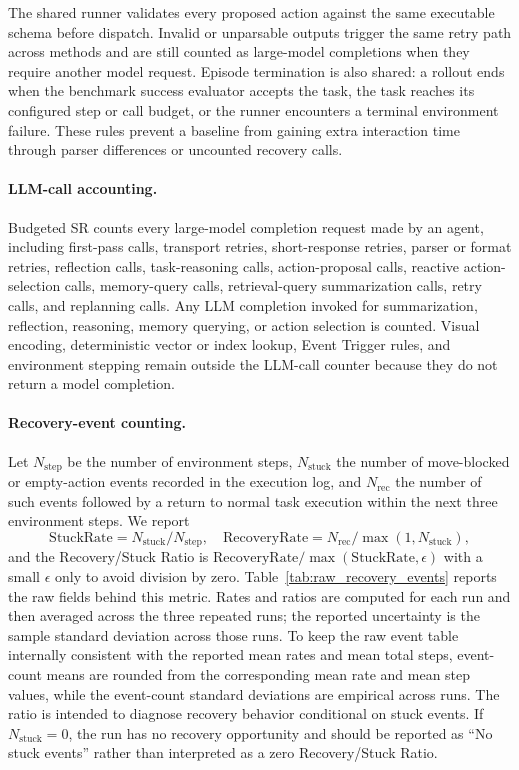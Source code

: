 The shared runner validates every proposed action against the same executable
schema before dispatch. Invalid or unparsable outputs trigger the same retry
path across methods and are still counted as large-model completions when they
require another model request. Episode termination is also shared: a rollout ends
when the benchmark success evaluator accepts the task, the task reaches its
configured step or call budget, or the runner encounters a terminal environment
failure. These rules prevent a baseline from gaining extra interaction time
through parser differences or uncounted recovery calls.

\paragraph{LLM-call accounting.}
\label{sec:appendix_llm_call_accounting}
Budgeted SR counts every large-model completion request made by an agent,
including first-pass calls, transport retries, short-response retries, parser
or format retries, reflection calls, task-reasoning calls, action-proposal
calls, reactive action-selection calls, memory-query calls, retrieval-query
summarization calls, retry calls, and replanning calls. Any LLM completion
invoked for summarization, reflection, reasoning, memory querying, or action
selection is counted. Visual encoding, deterministic vector or index lookup,
Event Trigger rules, and environment stepping remain outside the
LLM-call counter because they do not return a model completion.

\paragraph{Recovery-event counting.}
\label{sec:appendix_recovery_event_counting}
Let $N_{\mathrm{step}}$ be the number of environment steps,
$N_{\mathrm{stuck}}$ the number of move-blocked or empty-action events recorded
in the execution log, and $N_{\mathrm{rec}}$ the number of such events followed
by a return to normal task execution within the next three environment steps. We
report
\begin{equation}
\label{eq:recovery_metrics}
\mathrm{StuckRate}=N_{\mathrm{stuck}}/N_{\mathrm{step}},\quad
\mathrm{RecoveryRate}=N_{\mathrm{rec}}/\max(1,N_{\mathrm{stuck}}),
\end{equation}
and the Recovery/Stuck Ratio is
$\mathrm{RecoveryRate}/\max(\mathrm{StuckRate},\epsilon)$ with a small
$\epsilon$ only to avoid division by zero. Table~\mbox{\ref{tab:raw_recovery_events}}
reports the raw fields behind this metric. Rates and ratios are computed for
each run and then averaged across the three repeated runs; the reported
uncertainty is the sample standard deviation across those runs. To keep the raw
event table internally consistent with the reported mean rates and mean total
steps, event-count means are rounded from the corresponding mean rate and mean
step values, while the event-count standard deviations are empirical across
runs.
The ratio is intended to diagnose recovery behavior conditional on stuck
events. If $N_{\mathrm{stuck}}=0$, the run has no recovery opportunity and
should be reported as ``No stuck events'' rather than interpreted as a zero
Recovery/Stuck Ratio.

